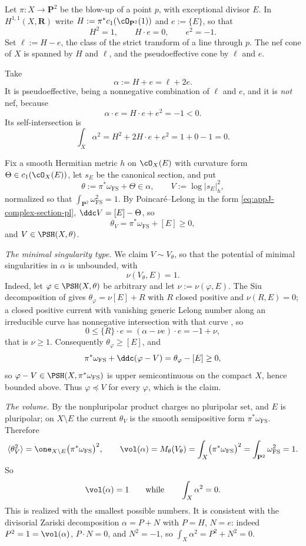 \begin{example}
\label{ex:ch51-blowup-mass}
Let \(\pi:X\to\mathbf P^2\) be the blow-up of a point \(p\), with
exceptional divisor \(E\).  In \(H^{1,1}(X,\mathbf R)\) write
\(H:=\pi^*c_1(\cO_{\mathbf P^2}(1))\) and \(e:=\{E\}\), so that
\[
 H^2=1,\qquad H\cdot e=0,\qquad e^2=-1 .
\]
Set \(\ell:=H-e\), the class of the strict transform of a line through
\(p\).  The nef cone of \(X\) is spanned by \(H\) and \(\ell\), and the
pseudoeffective cone by \(\ell\) and \(e\).

Take
\[
 \alpha:=H+e=\ell+2e .
\]
It is pseudoeffective, being a nonnegative combination of \(\ell\) and
\(e\), and it is \emph{not} nef, because
\[
 \alpha\cdot e=H\cdot e+e^2=-1<0 .
\]
Its self-intersection is
\[
 \int_X\alpha^2=H^2+2H\cdot e+e^2=1+0-1=0 .
\]

Fix a smooth Hermitian metric \(h\) on \(\cO_X(E)\) with curvature form
\(\Theta\in c_1(\cO_X(E))\), let \(s_E\) be the canonical section, and
put
\[
 \theta:=\pi^*\omega_{\mathrm{FS}}+\Theta\in\alpha,
 \qquad
 V:=\log|s_E|^2_h ,
\]
normalized so that \(\int_{\mathbf P^2}\omega_{\mathrm{FS}}^2=1\).  By
Poincar\'e--Lelong in the form \eqref{eq:appJ-complex-section-pl},
\(\ddc V=[E]-\Theta\), so
\[
 \theta_V=\pi^*\omega_{\mathrm{FS}}+[E]\geq0,
\]
and \(V\in\PSH(X,\theta)\).

\emph{The minimal singularity type.}  We claim
\(V\sim V_\theta\), so that the potential of minimal singularities in
\(\alpha\) is unbounded, with
\[
 \nu(V_\theta,E)=1 .
\]
Indeed, let \(\varphi\in\PSH(X,\theta)\) be arbitrary and let
\(\nu:=\nu(\varphi,E)\).  The Siu decomposition of
 gives \(\theta_\varphi=\nu[E]+R\) with \(R\)
closed positive and \(\nu(R,E)=0\); a closed positive current with
vanishing generic Lelong number along an irreducible curve has
nonnegative intersection with that curve \cite{Bou04}, so
\[
 0\leq\{R\}\cdot e=(\alpha-\nu e)\cdot e=-1+\nu ,
\]
that is \(\nu\geq1\).  Consequently \(\theta_\varphi\geq[E]\), and
\[
 \pi^*\omega_{\mathrm{FS}}+\ddc(\varphi-V)
 =\theta_\varphi-[E]\geq0 ,
\]
so \(\varphi-V\in\PSH(X,\pi^*\omega_{\mathrm{FS}})\) is upper
semicontinuous on the compact \(X\), hence bounded above.  Thus
\(\varphi\preceq V\) for every \(\varphi\), which is the claim.

\emph{The volume.}  By  the nonpluripolar
product charges no pluripolar set, and \(E\) is pluripolar; on
\(X\setminus E\) the current \(\theta_V\) is the smooth semipositive form
\(\pi^*\omega_{\mathrm{FS}}\).  Therefore
\[
 \langle\theta_V^2\rangle
 =\one_{X\setminus E}\bigl(\pi^*\omega_{\mathrm{FS}}\bigr)^2,
 \qquad
 \vol(\alpha)=M_\theta(V_\theta)
 =\int_X\bigl(\pi^*\omega_{\mathrm{FS}}\bigr)^2
 =\int_{\mathbf P^2}\omega_{\mathrm{FS}}^2=1 .
\]
So
\[
 \vol(\alpha)=1
 \qquad\text{while}\qquad
 \int_X\alpha^2=0 .
\]
This is  realized with the
smallest possible numbers.  It is consistent with the divisorial Zariski
decomposition \(\alpha=P+N\) with \(P=H\), \(N=e\): indeed
\(P^2=1=\vol(\alpha)\), \(P\cdot N=0\), and \(N^2=-1\), so
\(\int_X\alpha^2=P^2+N^2=0\).


\end{example}
